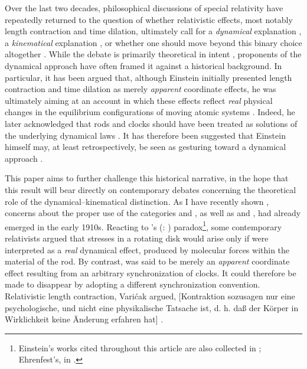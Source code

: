 \documentclass[pdflatex]{sn-jnl}
\renewcommand{\citets}[2][]{\citeauthor{#2}'s (\citeyear{#2}\if\relax\detokenize{#1}\relax\else: #1\fi)}
\begin{document}
Over the last two decades, philosophical discussions of special relativity have repeatedly returned to the question of whether relativistic effects, most notably length contraction and time dilation, ultimately call for a \emph{dynamical} explanation \citep{Brown2005,Brown2006}, a \emph{kinematical} explanation \citep{Norton2008,Janssen2009}, or whether one should move beyond this binary choice altogether \citep{Acuna2016}. While the debate is primarily theoretical in intent \citep{Read2020a,Acuña2025}, proponents of the dynamical approach have often framed it against a historical background. In particular, it has been argued that, although Einstein initially presented length contraction and time dilation as merely \emph{apparent} coordinate effects, he was ultimately aiming at an account in which these effects reflect \emph{real} physical changes in the equilibrium configurations of moving atomic systems \citep{Brown2022}. Indeed, he later acknowledged that rods and clocks should have been treated as solutions of the underlying dynamical laws \citep[61]{Einstein1949}. It has therefore been suggested that Einstein himself may, at least retrospectively, be seen as gesturing toward a dynamical approach \citep[70]{Brown2022}. 


This paper aims to further challenge this historical narrative, in the hope that this result will bear directly on contemporary debates concerning the theoretical role of the dynamical--kinematical distinction. As I have recently shown \citep{Giovanelli2023a}, concerns about the proper use of the categories  and , as well as  and , had already emerged in the early 1910s. Reacting to \citets{Ehrenfest1909} paradox\footnote{Einstein’s works cited throughout this article are also collected in \cite{CPAE}; Ehrenfest’s, in \cite{ECSP}.}, some contemporary relativists \citep{Ignatowski1910,Varicak1911} argued that stresses in a rotating disk would arise only if  were interpreted as a \emph{real} dynamical effect, produced by molecular forces within the material of the rod. By contrast,  was said to be merely an \emph{apparent} coordinate effect resulting from an arbitrary synchronization of clocks. It could therefore be made to disappear by adopting a different synchronization convention. Relativistic length contraction, Varićak argued, [Kontraktion sozusagen nur eine psychologische, und nicht eine physikalische Tatsache ist, d. h. daß der Körper in Wirklichkeit keine Änderung erfahren hat] \citep[169]{Varicak1911}.
\end{document}
